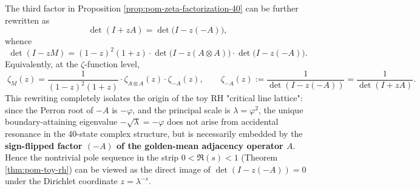 \begin{remark}\label{rem:pom-minusA-factor-critical-line}
The third factor in Proposition \ref{prop:pom-zeta-factorization-40} can be further rewritten as
$$
\det(I+zA)=\det\!\bigl(I-z(-A)\bigr),
$$
whence
$$
\boxed{\;
\det(I-zM)
=(1-z)^2(1+z)\cdot \det\!\bigl(I-z(A\otimes A)\bigr)\cdot \det\!\bigl(I-z(-A)\bigr).
\;}
$$
Equivalently, at the \(\zeta\)-function level,
$$
\boxed{\;
\zeta_M(z)
=\frac{1}{(1-z)^2(1+z)}\cdot \zeta_{A\otimes A}(z)\cdot \zeta_{-A}(z),
\qquad
\zeta_{-A}(z):=\frac{1}{\det(I-z(-A))}=\frac{1}{\det(I+zA)}.
\;}
$$
This rewriting completely isolates the origin of the toy RH "critical line lattice": since the Perron root of \(-A\) is \(-\varphi\), and the principal scale is \(\lambda=\varphi^2\), the unique boundary-attaining eigenvalue
\(
-\sqrt{\lambda}=-\varphi
\)
does not arise from accidental resonance in the 40-state complex structure, but is necessarily embedded by the \textbf{sign-flipped factor \((-A)\) of the golden-mean adjacency operator \(A\)}.
Hence the nontrivial pole sequence in the strip \(0<\Re(s)<1\) (Theorem \ref{thm:pom-toy-rh}) can be viewed as the direct image of \(\det(I-z(-A))=0\) under the Dirichlet coordinate \(z=\lambda^{-s}\).
\end{remark}

